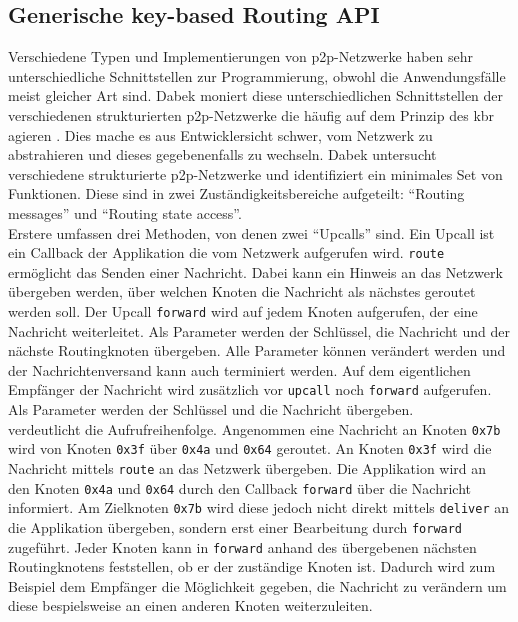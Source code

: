 \subsection{Generische key-based Routing API}
\label{chap:grundlagen:api}
Verschiedene Typen und Implementierungen von p2p-Netzwerke haben sehr unterschiedliche Schnittstellen zur Programmierung, obwohl die Anwendungsfälle meist gleicher Art sind. Dabek moniert diese unterschiedlichen Schnittstellen der verschiedenen strukturierten p2p-Netzwerke die häufig auf dem Prinzip des \ac{kbr} agieren \cite{Dabek2003Towards}. Dies mache es aus Entwicklersicht schwer, vom Netzwerk zu abstrahieren und dieses gegebenenfalls zu wechseln. Dabek untersucht verschiedene strukturierte p2p-Netzwerke und identifiziert ein minimales Set von Funktionen. Diese sind in zwei Zuständigkeitsbereiche aufgeteilt: \enquote{Routing messages} und \enquote{Routing state access}.\\
Erstere umfassen drei Methoden, von denen zwei \enquote{Upcalls} sind. Ein Upcall ist ein Callback der Applikation die vom Netzwerk aufgerufen wird. \texttt{route} ermöglicht das Senden einer Nachricht. Dabei kann ein Hinweis an das Netzwerk übergeben werden, über welchen Knoten die Nachricht als nächstes geroutet werden soll. Der Upcall \texttt{forward} wird auf jedem Knoten aufgerufen, der eine Nachricht weiterleitet. Als Parameter werden der Schlüssel, die Nachricht und der nächste Routingknoten übergeben. Alle Parameter können verändert werden und der Nachrichtenversand kann auch terminiert werden. Auf dem eigentlichen Empfänger der Nachricht wird zusätzlich vor \texttt{upcall} noch \texttt{forward} aufgerufen. Als Parameter werden der Schlüssel und die Nachricht übergeben.\\
 verdeutlicht die Aufrufreihenfolge. Angenommen eine Nachricht an Knoten \texttt{0x7b} wird von Knoten \texttt{0x3f} über \texttt{0x4a} und \texttt{0x64} geroutet. An Knoten \texttt{0x3f} wird die Nachricht mittels \texttt{route} an das Netzwerk übergeben. Die Applikation wird an den Knoten \texttt{0x4a} und \texttt{0x64} durch den Callback \texttt{forward} über die Nachricht informiert. Am Zielknoten \texttt{0x7b} wird diese jedoch nicht direkt mittels \texttt{deliver} an die Applikation übergeben, sondern erst einer Bearbeitung durch \texttt{forward} zugeführt. Jeder Knoten kann in \texttt{forward} anhand des übergebenen nächsten Routingknotens feststellen, ob er der zuständige Knoten ist. Dadurch wird zum Beispiel dem Empfänger die Möglichkeit gegeben, die Nachricht zu verändern um diese bespielsweise an einen anderen Knoten weiterzuleiten.

